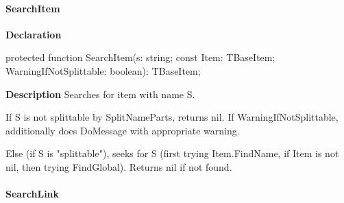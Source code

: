 \documentclass{report}
\newif\ifpdf
\begin{document}
\paragraph*{SearchItem}\hspace*{\fill}

\label{PasDoc_Gen.TDocGenerator-SearchItem}
\begin{list}{}{
\setlength{\itemindent}{0cm}
\setlength{\listparindent}{0cm}
\setlength{\leftmargin}{\evensidemargin}
\addtolength{\leftmargin}{\tmplength}
\settowidth{\labelsep}{X}
\addtolength{\leftmargin}{\labelsep}
\setlength{\labelwidth}{\tmplength}
}
\item[\textbf{Declaration}\hfill]
\ifpdf
\begin{flushleft}
\fi
\begin{ttfamily}
protected function SearchItem(s: string; const Item: TBaseItem; WarningIfNotSplittable: boolean): TBaseItem;\end{ttfamily}

\ifpdf
\end{flushleft}
\fi

\par
\item[\textbf{Description}]
Searches for item with name S.

If S is not splittable by SplitNameParts, returns nil. If WarningIfNotSplittable, additionally does DoMessage with appropriate warning.

Else (if S is "splittable"), seeks for S (first trying Item.FindName, if Item is not nil, then trying FindGlobal). Returns nil if not found.

\end{list}
\paragraph*{SearchLink}\hspace*{\fill}
\end{document}
